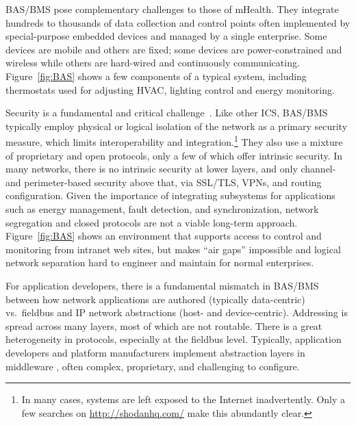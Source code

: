 BAS/BMS pose complementary challenges to those of mHealth. They integrate hundreds to thousands of data collection and control points often implemented by special-purpose embedded devices and managed by a single enterprise.  Some devices are mobile and others are fixed; some devices are power-constrained and wireless while others are hard-wired and continuously communicating. Figure~\ref{fig:BAS} shows a few components of a typical system, including thermostats used for adjusting HVAC, lighting control and energy monitoring. 

Security is a fundamental and critical challenge~\cite{knapp2011industrial}. 
Like other ICS, BAS/BMS typically employ physical or logical isolation of the network as a primary security measure, which limits interoperability and integration.\footnote{In many cases, systems are left exposed to the Internet inadvertently. Only a few searches on \url{http://shodanhq.com/} make this abundantly clear.}   They also use a mixture of proprietary and open protocols, only a few of which offer intrinsic security. In many networks, there is no intrinsic security at lower layers, and only channel- and perimeter-based security above that, via SSL/TLS, VPNs, and routing configuration. Given the importance of integrating subsystems for applications such as energy management, fault detection, and synchronization,  network segregation and closed protocols are not a viable long-term approach. Figure~\ref{fig:BAS} shows an environment that supports access to control and monitoring from intranet web sites, but makes ``air gaps'' impossible and logical network separation hard to engineer and maintain for normal enterprises. 

For application developers, there is a fundamental mismatch in BAS/BMS between how network applications are authored (typically data-centric) vs.~fieldbus and IP network abstractions (host- and device-centric).  
Addressing is spread across many layers, most of which are not routable. There is a great heterogeneity in protocols, especially at the fieldbus level.  Typically, application developers and platform manufacturers implement abstraction layers in middleware \cite{Sauter2010}, often complex, proprietary, and challenging to configure.


